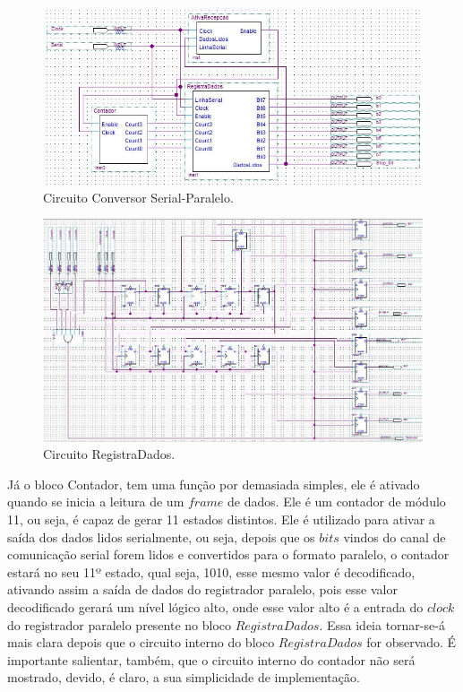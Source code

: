 \documentclass[12pt]{article}
\begin{document}
\begin{figure}[h]
\centering
\includegraphics[width=1\textwidth]{img/aa2.jpg}
\caption{Circuito Conversor Serial-Paralelo.}
\label{fig:aa2}
\end{figure}

\begin{figure}[h]
\centering
\includegraphics[width=1\textwidth]{img/aa1.jpg}
\caption{Circuito RegistraDados.}
\label{fig:fsm}
\end{figure}


Já o bloco Contador, tem uma função por demasiada simples, ele é ativado quando se inicia a leitura de um $frame$ de dados. Ele é um contador de módulo 11, ou seja, é capaz de gerar 11 estados distintos. Ele é utilizado para ativar a saída dos dados lidos serialmente, ou seja, depois que os $bits$ vindos do canal de comunicação serial forem lidos e convertidos para o formato paralelo, o contador estará no seu 11º estado, qual seja, 1010, esse mesmo valor é decodificado, ativando assim a saída de dados do registrador paralelo, pois esse valor decodificado gerará um nível lógico alto, onde esse valor alto é a entrada do $clock$ do registrador paralelo presente no bloco $RegistraDados$. Essa ideia tornar-se-á mais clara depois que o circuito interno do bloco $RegistraDados$ for observado. É importante salientar, também, que o circuito interno do contador não será mostrado, devido, é claro, a sua simplicidade de implementação.
\end{document}
